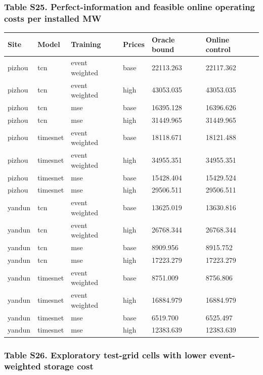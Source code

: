 \documentclass[a4paper,11pt]{article}
\newcounter{none}
\begin{document}
\subsubsection{Table S25. Perfect-information and feasible online operating costs per installed MW}\label{table-s25.-perfect-information-and-feasible-online-operating-costs-per-installed-mw}

{\def\LTcaptype{none} %
\begin{longtable}[]{@{}llllll@{}}
\toprule\noalign{}
Site & Model & Training & Prices & Oracle bound & Online control \\
\midrule\noalign{}
\endhead
\bottomrule\noalign{}
\endlastfoot
pizhou & tcn & event weighted & base & 22113.263 & 22117.362 \\
pizhou & tcn & event weighted & high & 43053.035 & 43053.035 \\
pizhou & tcn & mse & base & 16395.128 & 16396.626 \\
pizhou & tcn & mse & high & 31449.965 & 31449.965 \\
pizhou & timesnet & event weighted & base & 18118.671 & 18121.488 \\
pizhou & timesnet & event weighted & high & 34955.351 & 34955.351 \\
pizhou & timesnet & mse & base & 15428.404 & 15429.524 \\
pizhou & timesnet & mse & high & 29506.511 & 29506.511 \\
yandun & tcn & event weighted & base & 13625.019 & 13630.816 \\
yandun & tcn & event weighted & high & 26768.344 & 26768.344 \\
yandun & tcn & mse & base & 8909.956 & 8915.752 \\
yandun & tcn & mse & high & 17223.279 & 17223.279 \\
yandun & timesnet & event weighted & base & 8751.009 & 8756.806 \\
yandun & timesnet & event weighted & high & 16884.979 & 16884.979 \\
yandun & timesnet & mse & base & 6519.700 & 6525.497 \\
yandun & timesnet & mse & high & 12383.639 & 12383.639 \\
\end{longtable}
}

\subsubsection{Table S26. Exploratory test-grid cells with lower event-weighted storage cost}\label{table-s26.-exploratory-test-grid-cells-with-lower-event-weighted-storage-cost}
\end{document}

